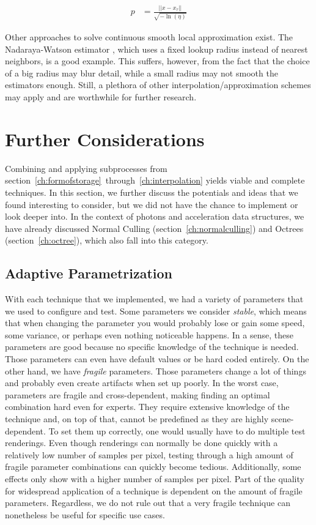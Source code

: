 \begin{align}
p &= \frac{||x-x_\tau||}{\sqrt{-\ln(\eta)}} \label{eq:p0}
\end{align}

Other approaches to solve continuous smooth local approximation exist. The Nadaraya-Watson estimator \parencite{nadaraya1964estimating}, which uses a fixed lookup radius instead of nearest neighbors, is a good example. This suffers, however, from the fact that the choice of a big radius may blur detail, while a small radius may not smooth the estimators enough. Still, a plethora of other interpolation/approximation schemes may apply and are worthwhile for further research.


\section{Further Considerations}
\label{sec:futhercons}
Combining and applying subprocesses from section~\ref{ch:formofstorage}~through~\ref{ch:interpolation} yields viable and complete techniques. In this section, we further discuss the potentials and ideas that we found interesting to consider, but we did not have the chance to implement or look deeper into. In the context of photons and acceleration data structures, we have already discussed Normal Culling (section~\ref{ch:normalculling}) and Octrees (section~\ref{ch:octree}), which also fall into this category.

\subsection{Adaptive Parametrization}

With each technique that we implemented, we had a variety of parameters that we used to configure and test. Some parameters we consider \textit{stable}, which means that when changing the parameter you would probably lose or gain some speed, some variance, or perhaps even nothing noticeable happens. In a sense, these parameters are good because no specific knowledge of the technique is needed. Those parameters can even have default values or be hard coded entirely. On the other hand, we have \textit{fragile} parameters. Those parameters change a lot of things and probably even create artifacts when set up poorly. In the worst case, parameters are fragile and cross-dependent, making finding an optimal combination hard even for experts. They require extensive knowledge of the technique and, on top of that, cannot be predefined as they are highly scene-dependent. To set them up correctly, one would usually have to do multiple test renderings. Even though renderings can normally be done quickly with a relatively low number of samples per pixel, testing through a high amount of fragile parameter combinations can quickly become tedious. Additionally, some effects only show with a higher number of samples per pixel. Part of the quality for widespread application of a technique is dependent on the amount of fragile parameters. Regardless, we do not rule out that a very fragile technique can nonetheless be useful for specific use cases.

